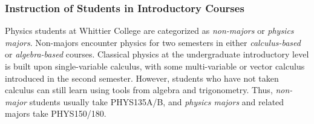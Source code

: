 \documentclass[../../main.tex]{subfiles}
\begin{document}
\subsubsection{Instruction of Students in Introductory Courses}

\label{sec:teaching_phil1}

Physics students at Whittier College are categorized as \textit{non-majors} or \textit{physics majors}.  Non-majors encounter physics for two semesters in either \textit{calculus-based} or \textit{algebra-based} courses.  Classical physics at the undergraduate introductory level is built upon single-variable calculus, with some multi-variable or vector calculus introduced in the second semester.  However, students who have not taken calculus can still learn using tools from algebra and trigonometry.  Thus, \textit{non-major} students usually take PHYS135A/B, and \textit{physics majors} and related majors take PHYS150/180.  \\ \hspace{0.1cm}
\end{document}
